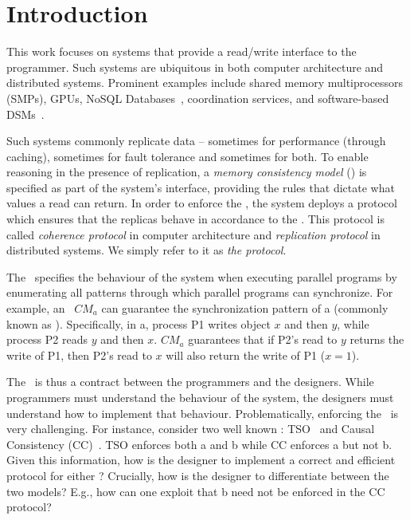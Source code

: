 \section{Introduction}

This work focuses on  systems that provide a read/write interface to the programmer. Such systems are ubiquitous in both computer architecture and  distributed systems. Prominent examples include shared memory multiprocessors (SMPs), GPUs, NoSQL Databases~\cite{twitter:2016}, coordination services\cite{Hunt:2010}, and software-based DSMs~\cite{Keleher:1994}.

Such systems commonly replicate data -- sometimes for performance (through caching), sometimes for fault tolerance and sometimes for both.
To enable reasoning in the presence of replication, a \emph{memory consistency model} (\emph{\mcm}) is specified as part of the system's interface, providing the rules that dictate what values a read can return.
In order to enforce the \mcm, the system deploys a protocol which ensures that the replicas behave in accordance to the \mcm. This protocol is called \emph{coherence protocol} in computer architecture and \emph{replication protocol} in distributed systems. We simply refer to it as \emph{the protocol}.

The \mcm\ specifies the behaviour of the system when executing parallel programs by enumerating all patterns through which parallel programs can synchronize.
For example, an \mcm\  $CM_a$ can guarantee the synchronization pattern of a (commonly known as ). Specifically, in a, process P1 writes object $x$ and then $y$, while process P2 reads $y$ and then $x$. 
$CM_a$ guarantees that if P2's read to $y$ returns the write of P1, then P2's read to $x$ will also return the write of P1 (\ie $x=1$).



\custvspace
The \mcm\ is thus  a contract between the programmers and the designers. While programmers must understand the behaviour of the system, the designers must understand how to implement that behaviour.
Problematically, enforcing the \mcm\ is very challenging. 
For instance, consider two well known \mcms: TSO~\cite{Owens:2009} and Causal Consistency (CC)~\cite{Petersen:1997}. TSO enforces both a and b while CC enforces a but not b.
Given this information, how is the designer to implement a correct and efficient protocol for either \mcm?
Crucially, how is the designer to differentiate between the two models? E.g., how can one exploit that b need not be enforced in the CC protocol? 

